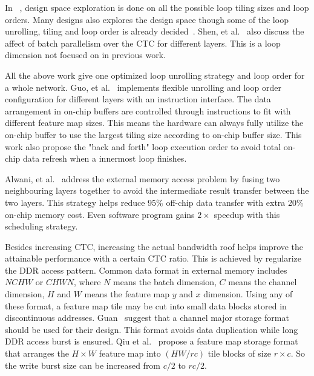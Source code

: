 In ~\cite{zhang2015optimizing, ma2017optimizing}, design space exploration is done on all the possible loop tiling sizes and loop orders. Many designs also explores the design space though some of the loop unrolling, tiling and loop order is already decided~\cite{motamedi2016design, qiu2016going}. Shen, et al.~\cite{shen2017escher} also discuss the affect of batch parallelism over the CTC for different layers. This is a loop dimension not focused on in previous work.

All the above work give one optimized loop unrolling strategy and loop order for a whole network. Guo, et al.~\cite{guo2017angel} implements flexible unrolling and loop order configuration for different layers with an instruction interface. The data arrangement in on-chip buffers are controlled through instructions to fit with different feature map sizes. This means the hardware can always fully utilize the on-chip buffer to use the largest tiling size according to on-chip buffer size. This work also propose the "back and forth" loop execution order to avoid total on-chip data refresh when a innermost loop finishes.

Alwani, et al.~\cite{alwani2016fused} address the external memory access problem by fusing two neighbouring layers together to avoid the intermediate result transfer between the two layers. This strategy helps reduce 95\% off-chip data transfer with extra 20\% on-chip memory cost. Even software program gains $2\times$ speedup with this scheduling strategy.

Besides increasing CTC, increasing the actual bandwidth roof helps improve the attainable performance with a certain CTC ratio. This is achieved by regularize the DDR access pattern. Common data format in external memory includes $NCHW$ or $CHWN$, where $N$ means the batch dimension, $C$ means the channel dimension, $H$ and $W$ means the feature map $y$ and $x$ dimension. Using any of these format, a feature map tile may be cut into small data blocks stored in discontinuous addresses. Guan~\cite{guan2017fp} suggest that a channel major storage format should be used for their design. This format avoids data duplication while long DDR access burst is ensured. Qiu et al.~\cite{qiu2016going} propose a feature map storage format that arranges the $H\times W$ feature map into $(HW/rc)$ tile blocks of size $r\times c$. So the write burst size can be increased from $c/2$ to $rc/2$.
